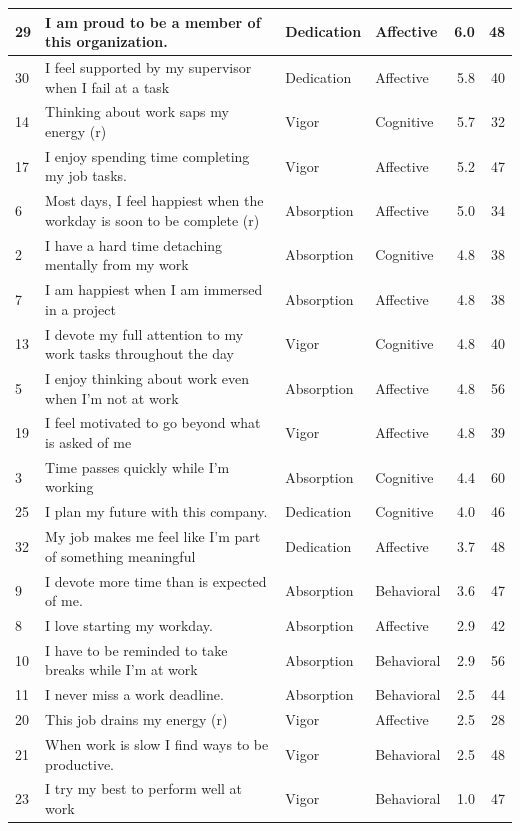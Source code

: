 \documentclass[
]{book}
\begin{document}
\begin{table}
\begin{tabular}[t]{l|l|l|l|r|r}
\hline
29 & I am proud to be a member of this organization. & Dedication & Affective & 6.0 & 48\\
\hline
30 & I feel supported by my supervisor when I fail at a task & Dedication & Affective & 5.8 & 40\\
\hline
14 & Thinking about work saps my energy (r) & Vigor & Cognitive & 5.7 & 32\\
\hline
17 & I enjoy spending time completing my job tasks. & Vigor & Affective & 5.2 & 47\\
\hline
6 & Most days, I feel happiest when the workday is soon to be complete (r) & Absorption & Affective & 5.0 & 34\\
\hline
2 & I have a hard time detaching mentally from my work & Absorption & Cognitive & 4.8 & 38\\
\hline
7 & I am happiest when I am immersed in a project & Absorption & Affective & 4.8 & 38\\
\hline
13 & I devote my full attention to my work tasks throughout the day & Vigor & Cognitive & 4.8 & 40\\
\hline
5 & I enjoy thinking about work even when I’m not at work & Absorption & Affective & 4.8 & 56\\
\hline
19 & I feel motivated to go beyond what is asked of me & Vigor & Affective & 4.8 & 39\\
\hline
3 & Time passes quickly while I’m working & Absorption & Cognitive & 4.4 & 60\\
\hline
25 & I plan my future with this company. & Dedication & Cognitive & 4.0 & 46\\
\hline
32 & My job makes me feel like I’m part of something meaningful & Dedication & Affective & 3.7 & 48\\
\hline
9 & I devote more time than is expected of me. & Absorption & Behavioral & 3.6 & 47\\
\hline
8 & I love starting my workday. & Absorption & Affective & 2.9 & 42\\
\hline
10 & I have to be reminded to take breaks while I’m at work & Absorption & Behavioral & 2.9 & 56\\
\hline
11 & I never miss a work deadline. & Absorption & Behavioral & 2.5 & 44\\
\hline
20 & This job drains my energy (r) & Vigor & Affective & 2.5 & 28\\
\hline
21 & When work is slow I find ways to be productive. & Vigor & Behavioral & 2.5 & 48\\
\hline
23 & I try my best to perform well at work & Vigor & Behavioral & 1.0 & 47\\
\hline
\end{tabular}
\end{table}
\end{document}
